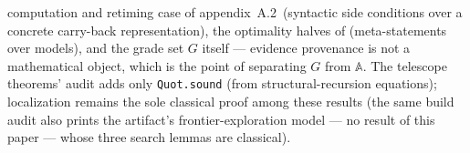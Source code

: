 computation and retiming case of appendix~A.2\ (syntactic
side
conditions over a concrete carry-back representation), the optimality
halves of  (meta-statements over models), and
the grade set $G$ itself --- evidence provenance is not a mathematical
object, which is the point of separating $G$ from $\mathbb{A}$. The
telescope theorems' audit adds only \texttt{Quot.sound} (from
structural-recursion equations); localization remains the sole
classical proof among these results (the same build audit also prints
the artifact's frontier-exploration model --- no result of this
paper --- whose three search lemmas are classical).
